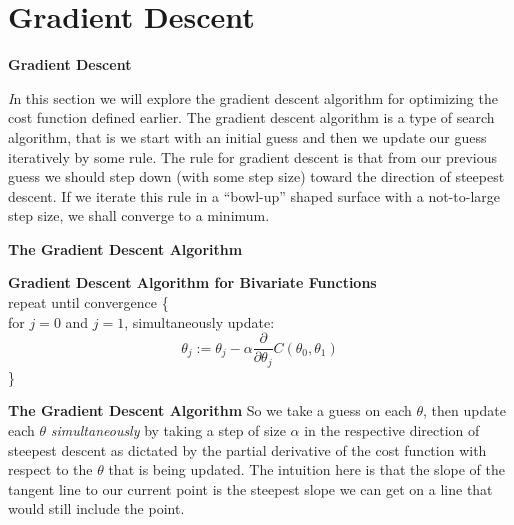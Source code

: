 \documentclass[xcolor=dvipsnames]{beamer}
\begin{document}
\section{Gradient Descent}
\begin{frame}
{\bf Gradient Descent}

{\it\huge I}n this section we will explore the gradient descent algorithm for optimizing the cost function defined earlier. \vfill\pause 
The gradient descent algorithm is a type of search algorithm, that is we start with an initial guess and then we update our guess iteratively by some rule. \vfill\pause 
The rule for gradient descent is that from our previous guess we should step down (with some step size) toward the direction of steepest descent.\vfill\pause 
If we iterate this rule in a ``bowl-up'' shaped surface with a not-to-large step size, we shall converge to a minimum.
\end{frame}

\begin{frame}
{\bf The Gradient Descent Algorithm}
\begin{framed}
{\bf Gradient Descent Algorithm for Bivariate Functions}\\

\noindent repeat until convergence \{\\
\indent for $j = 0$ and $j = 1$, simultaneously update:
\[
\theta_j := \theta_j - \alpha \frac{\partial}{\partial \theta_j} C(\theta_0,\theta_1)
\]
\}

\end{framed}
\end{frame}

\begin{frame}
{\bf The Gradient Descent Algorithm}
So we take a guess on each $\theta$, then update each $\theta$ \emph{simultaneously} by taking a step of size $\alpha$ in the respective direction of steepest descent as dictated by the partial derivative of the cost function with respect to the $\theta$ that is being updated. \vfill\pause
The intuition here is that the slope of the tangent line to our current point is the steepest slope we can get on a line that would still include the point.\\
\end{frame}
\end{document}
